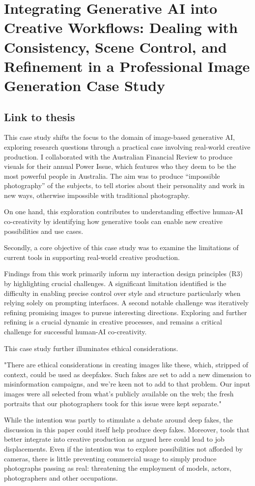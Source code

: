 \chapter{Integrating Generative AI into Creative Workflows: Dealing with Consistency, Scene Control, and Refinement in a Professional Image Generation Case Study} \label{c:tc6} 

\section{Link to thesis}

This case study shifts the focus to the domain of image-based generative AI, exploring research questions through a practical case involving real-world creative production. I collaborated with the Australian Financial Review to produce visuals for their annual Power Issue, which features who they deem to be the most powerful people in Australia. The aim was to produce “impossible photography” of the subjects, to tell stories about their personality and work in new ways, otherwise impossible with traditional photography. 

On one hand, this exploration contributes to understanding effective human-AI co-creativity by identifying how generative tools can enable new creative possibilities and use cases.

Secondly, a core objective of this case study was to examine the limitations of current tools in supporting real-world creative production. 

Findings from this work primarily inform my interaction design principles (R3) by highlighting crucial challenges. A significant limitation identified is the difficulty in enabling precise control over style and structure particularly when relying solely on prompting interfaces. A second notable challenge was iteratively refining promising images to pursue interesting directions. Exploring and further refining is a crucial dynamic in creative processes, and remains a critical challenge for successful human-AI co-creativity. 

This case study further illuminates ethical considerations. 

"There are ethical considerations in creating images like these, which, stripped of context, could be used as deepfakes. Such fakes are set to add a new dimension to misinformation campaigns, and we’re keen not to add to that problem. Our input images were all selected from what’s publicly available on the web; the fresh portraits that our photographers took for this issue were kept separate."




While the intention was partly to stimulate a debate around deep fakes, the discussion in this paper could itself help produce deep fakes. Moreover, tools that better integrate into creative production as argued here could lead to job displacements. Even if the intention was to explore possibilities not afforded by cameras, there is little preventing commercial usage to simply produce photographs passing as real: threatening the employment of models, actors, photographers and other occupations. 




